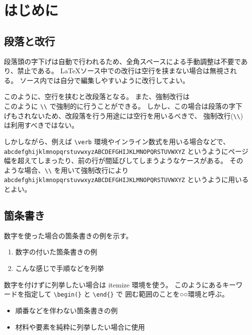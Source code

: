 \chapter{はじめに}
\label{chp:first}

\section{段落と改行}
\label{sec:paragraph}

段落頭の字下げは自動で行われるため、全角スペースによる手動調整は不要であり、禁止である。
\LaTeX ソース中での改行は空行を挟まない場合は無視される。
ソース内では自分で編集しやすいように改行してよい。

このように、空行を挟むと改段落となる。
また、強制改行は\\このように \verb+\\+ で強制的に行うことができる。
しかし、この場合は段落の字下げもされないため、改段落を行う用途には空行を用いるべきで、
強制改行(\verb+\\+)は利用すべきではない。

しかしながら、例えば \verb+\verb+ 環境やインライン数式を用いる場合などで、
\verb+abcdefghijklmnopqrstuvwxyzABCDEFGHIJKLMNOPQRSTUVWXYZ+
というようにページ幅を超えてしまったり、前の行が間延びしてしまうようなケースがある。
そのような場合、\verb+\\+ を用いて強制改行により \\
\verb+abcdefghijklmnopqrstuvwxyzABCDEFGHIJKLMNOPQRSTUVWXYZ+
というように用いるとよい。

\section{箇条書き}
\label{sec:enum}

数字を使った場合の箇条書きの例を示す。

\begin{enumerate}
 \item 数字の付いた箇条書きの例
 \item こんな感じで手順などを列挙
\end{enumerate}

数字を付けずに列挙したい場合は itemize 環境を使う。
このようにあるキーワードを指定して \verb+\begin(}+ と \verb+\end{}+ で
囲む範囲のことを○○環境と呼ぶ。

\begin{itemize}
 \item 順番などを伴わない箇条書きの例
 \item 材料や要素を純粋に列挙したい場合に使用
\end{itemize}

